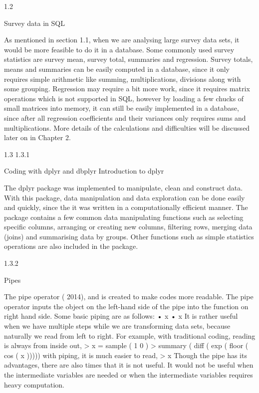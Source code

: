 1.2

Survey data in SQL

As mentioned in section 1.1, when we are analysing large survey data sets, it would
be more feasible to do it in a database. Some commonly used survey statistics are
survey mean, survey total, summaries and regression.
Survey totals, means and summaries can be easily computed in a database, since
it only requires simple arithmetic like summing, multiplications, divisions along
with some grouping.
Regression may require a bit more work, since it requires matrix operations
which is not supported in SQL, however by loading a few chucks of small matrices
into memory, it can still be easily implemented in a database, since after all regression coefficients and their variances only requires sums and multiplications.
More details of the calculations and difficulties will be discussed later on in
Chapter 2.

1.3
1.3.1

Coding with dplyr and dbplyr
Introduction to dplyr

The dplyr package was implemented to manipulate, clean and construct data. With
this package, data manipulation and data exploration can be done easily and quickly,
since the it was written in a computationally efficient manner.
The package contains a few common data manipulating functions such as selecting specific columns, arranging or creating new columns, filtering rows, merging
data (joins) and summarising data by groups. Other functions such as simple statistics operations are also included in the package.

1.3.2

Pipes

The pipe operator (%
2014), and is created to make codes more readable. The pipe operator inputs the
object on the left-hand side of the pipe into the function on right hand side. Some
basic piping are as follows:
• x %
• x %
It is rather useful when we have multiple steps while we are transforming data sets,
because naturally we read from left to right. For example, with traditional coding,
reading is always from inside out,
> x = sample ( 1 0 )
> summary ( diff ( exp ( floor ( cos ( x )))))
with piping, it is much easier to read,
> x %
Though the pipe has its advantages, there are also times that it is not useful. It would
not be useful when the intermediate variables are needed or when the intermediate
variables requires heavy computation.

